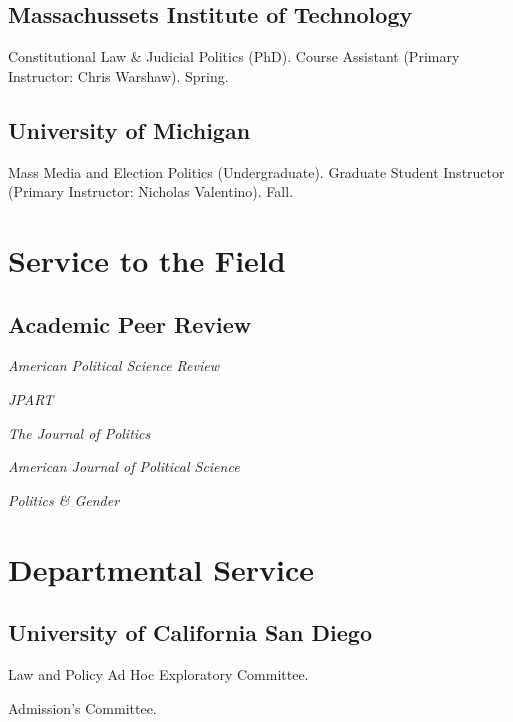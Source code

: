 \documentclass[12pt,letterpaper]{report}
\newcommand{\listitemspace}{0.25em}
\renewenvironment{itemize}
{\begin{list}{}{\setlength{\leftmargin}{0em}
                \setlength{\parskip}{0em}
                \setlength{\itemsep}{\listitemspace}
                \setlength{\parsep}{\listitemspace}}}
{\end{list}}
\newcommand{\course}[5]{\item[#1] \tab{}#3 (#4). #5. #2.} %
\begin{document}
    \subsection*{Massachussets Institute of Technology}
    \begin{tablist}
    \course{2015}{Spring}{Constitutional Law \& Judicial Politics}{PhD}{Course Assistant (Primary Instructor: Chris Warshaw)}
    \end{tablist}

   \subsection*{University of Michigan}

   \begin{tablist}
    \course{2013}{Fall}{Mass Media and Election Politics}{Undergraduate}{Graduate Student Instructor (Primary Instructor: Nicholas Valentino)}
    \end{tablist}
    
    
    \section*{Service to the Field}
    \subsection*{Academic Peer Review}
    
    \begin{itemize}
        \item[] \emph{American Political Science Review}
        \item[] \emph{JPART}
        \item[] \emph{The Journal of Politics}
        \item[] \emph{American Journal of Political Science}
        \item[] \emph{Politics \& Gender}
    \end{itemize}
    
    \section*{Departmental Service}
    
    \subsection*{University of California San Diego}
    \begin{tablist}
        \item[2021-] \tab{}Law and Policy Ad Hoc Exploratory Committee.
        \item[2020-] \tab{}Admission's Committee.
    \end{tablist}
    
\end{document}

